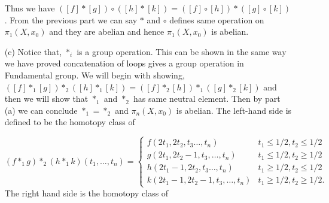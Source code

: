 \documentclass[11pt]{article}
\begin{document}
\begin{itemize}
    Thus we have $([f]\ast[g])\circ([h]\ast [k]) = ([f]\circ [h])\ast ([g]\circ [k])$. From the previous part we can say $\ast$ and $\circ$ defines same operation on $\pi_1(X,x_0)$ and they are abelian and hence $\pi_1(X,x_0)$ is abelian. 
    \item[(c)] Notice that, $\ast_i$ is a group operation. This can be shown in the same way we have proved concatenation of loops gives a group operation in Fundamental group. We will begin with showing, $([f] \ast_1 [g])\ast_2([h] \ast_1 [k])=([f]\ast_2[h]) \ast_1 ([g]\ast_2[k])$ and then we will show that $\ast_1$ and $\ast_2$ has same neutral element. Then by part (a) we can conclude $\ast_1 = \ast_2$ and $\pi_n(X,x_0)$ is abelian. The left-hand side is defined to be the homotopy class of

    $$
    (f \ast_1  g)\ast_2(h \ast_1  k)\left(t_{1}, \ldots, t_{n}\right)= \begin{cases}f\left(2 t_{1}, 2 t_{2}, t_{3} \ldots, t_{n}\right) & t_{1} \leq 1 / 2, t_{2} \leq 1 / 2 \\ g\left(2 t_{1}, 2 t_{2}-1, t_{3}, \ldots, t_{n}\right) & t_{1} \leq 1 / 2, t_{2} \geq 1 / 2 \\ h\left(2 t_{1}-1,2 t_{2}, t_{3} \ldots, t_{n}\right) & t_{1} \geq 1 / 2, t_{2} \leq 1 / 2 \\ k\left(2 t_{1}-1,2 t_{2}-1, t_{3}, \ldots, t_{n}\right) & t_{1} \geq 1 / 2, t_{2} \geq 1 / 2 .\end{cases}
    $$
    The right hand side is the homotopy class of


\end{itemize}
\end{document}
